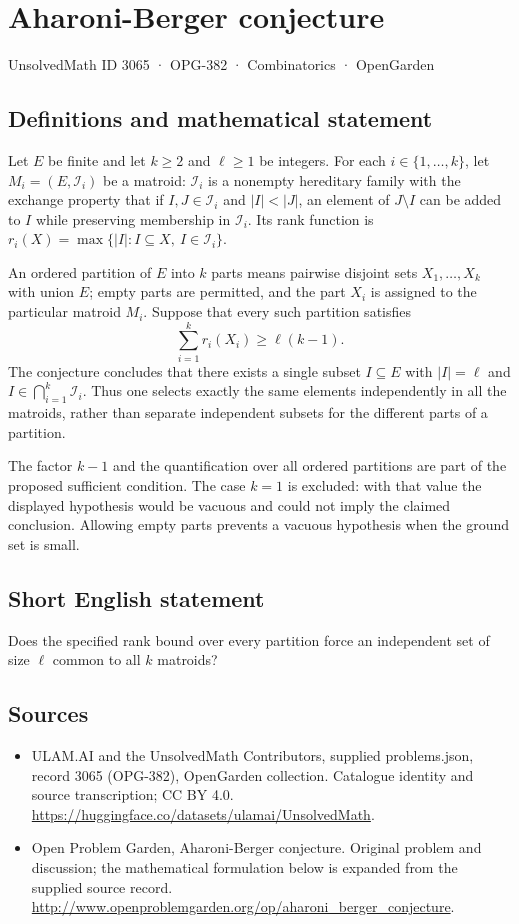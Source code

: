 \documentclass[11pt,a4paper]{article}
\begin{document}
\section*{Aharoni-Berger conjecture}\label{3065}
{\small UnsolvedMath ID 3065 · OPG-382 · Combinatorics · OpenGarden}
\subsection{Definitions and mathematical statement}
Let $E$ be finite and let $k\ge2$ and $\ell\ge1$ be integers.
For each $i\in\{1,\ldots,k\}$, let $M_i=(E,\mathcal I_i)$ be a matroid:
$\mathcal I_i$ is a nonempty hereditary family with the exchange property
that if $I,J\in\mathcal I_i$ and $|I|<|J|$, an element of $J\setminus I$
can be added to $I$ while preserving membership in $\mathcal I_i$.
Its rank function is
$r_i(X)=\max\{|I|:I\subseteq X,\ I\in\mathcal I_i\}$.

An ordered partition of $E$ into $k$ parts means pairwise disjoint sets
$X_1,\ldots,X_k$ with union $E$; empty parts are permitted, and the part
$X_i$ is assigned to the particular matroid $M_i$.
Suppose that every such partition satisfies
\[
 \sum_{i=1}^k r_i(X_i)\ge\ell(k-1).
\]
The conjecture concludes that there exists a single subset $I\subseteq E$
with $|I|=\ell$ and $I\in\bigcap_{i=1}^k\mathcal I_i$.
Thus one selects exactly the same elements independently in all the
matroids, rather than separate independent subsets for the different
parts of a partition.

The factor $k-1$ and the quantification over all ordered partitions are
part of the proposed sufficient condition. The case $k=1$ is excluded:
with that value the displayed hypothesis would be vacuous and could
not imply the claimed conclusion. Allowing empty parts prevents a
vacuous hypothesis when the ground set is small.
\subsection{Short English statement}
Does the specified rank bound over every partition force an independent set of size $\ell$ common to all $k$ matroids?
\subsection{Sources}
\begin{itemize}
\item[S1] ULAM.AI and the UnsolvedMath Contributors, supplied problems.json, record 3065 (OPG-382), OpenGarden collection. Catalogue identity and source transcription; CC BY 4.0.
\url{https://huggingface.co/datasets/ulamai/UnsolvedMath}.
\item[S2] Open Problem Garden, Aharoni-Berger conjecture. Original problem and discussion; the mathematical formulation below is expanded from the supplied source record.
\url{http://www.openproblemgarden.org/op/aharoni_berger_conjecture}.
\end{itemize}
\end{document}
